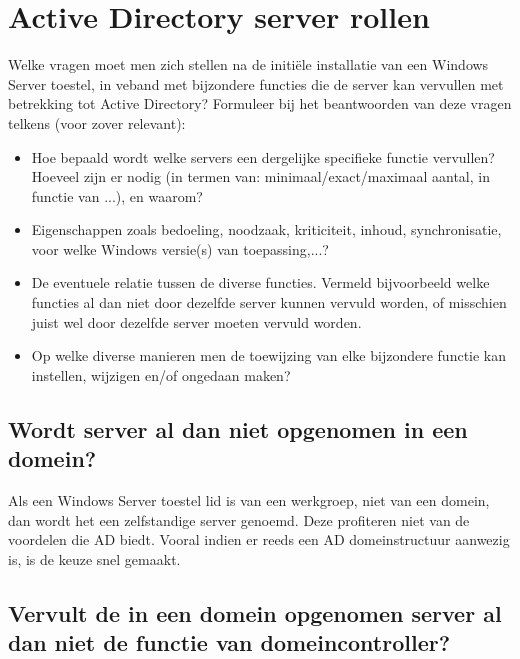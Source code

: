 \chapter{Active Directory server rollen}

Welke vragen moet men zich stellen na de initiële installatie van een Windows
Server toestel, in veband met bijzondere functies die de server kan vervullen
met betrekking tot Active Directory? Formuleer bij het beantwoorden van deze
vragen telkens (voor zover relevant):
\begin{itemize}
	\item Hoe bepaald wordt welke servers een dergelijke specifieke functie
		vervullen?  Hoeveel zijn er nodig (in termen van:
		minimaal/exact/maximaal aantal, in functie van ...), en waarom?
	\item Eigenschappen zoals bedoeling, noodzaak, kriticiteit, inhoud,
		synchronisatie, voor welke Windows versie(s) van toepassing,...?
	\item De eventuele relatie tussen de diverse functies. Vermeld
		bijvoorbeeld welke functies al dan niet door dezelfde server
		kunnen vervuld worden, of misschien juist wel door dezelfde
		server moeten vervuld worden.
	\item Op welke diverse manieren men de toewijzing van elke bijzondere
		functie kan instellen, wijzigen en/of ongedaan maken?
\end{itemize}

\section{Wordt server al dan niet opgenomen in een domein?}

Als een Windows Server toestel lid is van een werkgroep, niet van een domein,
dan wordt het een zelfstandige server genoemd. Deze profiteren niet van de
voordelen die AD biedt. Vooral indien er reeds een AD domeinstructuur aanwezig
is, is de keuze snel gemaakt.

\section{Vervult de in een domein opgenomen server al dan niet de functie van
domeincontroller?}

